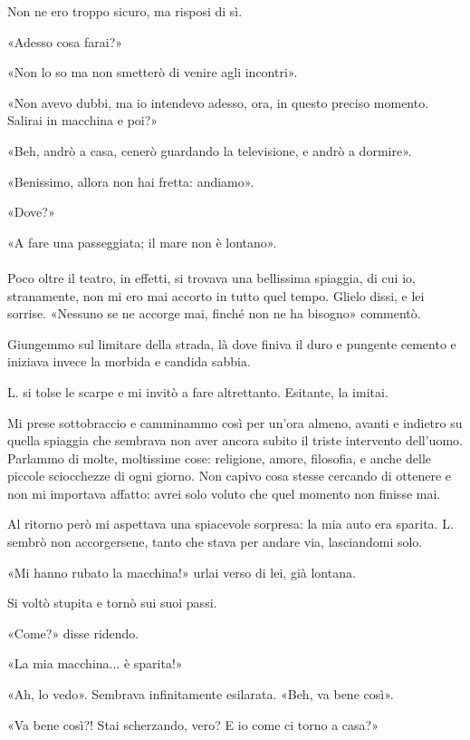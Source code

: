 \documentclass[a4paper,12pt]{book}
\begin{document}
Non ne ero troppo sicuro, ma risposi di sì.

«Adesso cosa farai?»

«Non lo so ma non smetterò di venire agli incontri».

«Non avevo dubbi, ma io intendevo adesso, ora, in questo preciso momento.
Salirai in macchina e poi?»

«Beh, andrò a casa, cenerò guardando la televisione, e andrò a dormire».

«Benissimo, allora non hai fretta: andiamo».

«Dove?»

«A fare una passeggiata; il mare non è lontano».

\paragraph{}
Poco oltre il teatro, in effetti, si trovava una bellissima spiaggia, di cui io,
stranamente, non mi ero mai accorto in tutto quel tempo. Glielo dissi, e lei
sorrise. «Nessuno se ne accorge mai, finché non ne ha bisogno» commentò.

Giungemmo sul limitare della strada, là dove finiva il duro e pungente cemento
e iniziava invece la morbida e candida sabbia.

L. si tolse le scarpe e mi invitò a fare altrettanto. Esitante, la imitai.

Mi prese sottobraccio e camminammo così per un'ora almeno, avanti e indietro
su quella spiaggia che sembrava non aver ancora subito il triste intervento
dell'uomo. Parlammo di molte, moltissime cose: religione, amore, filosofia, e
anche delle piccole sciocchezze di ogni giorno. Non capivo cosa stesse cercando
di ottenere e non mi importava affatto: avrei solo voluto che quel momento non
finisse mai.

Al ritorno però mi aspettava una spiacevole sorpresa: la mia auto era sparita.
L. sembrò non accorgersene, tanto che stava per andare via, lasciandomi solo.

«Mi hanno rubato la macchina!» urlai verso di lei, già lontana.

Si voltò stupita e tornò sui suoi passi.

«Come?» disse ridendo.

«La mia macchina... è sparita!»

«Ah, lo vedo». Sembrava infinitamente esilarata. «Beh, va bene così».

«Va bene così?! Stai scherzando, vero? E io come ci torno a casa?»
\end{document}
